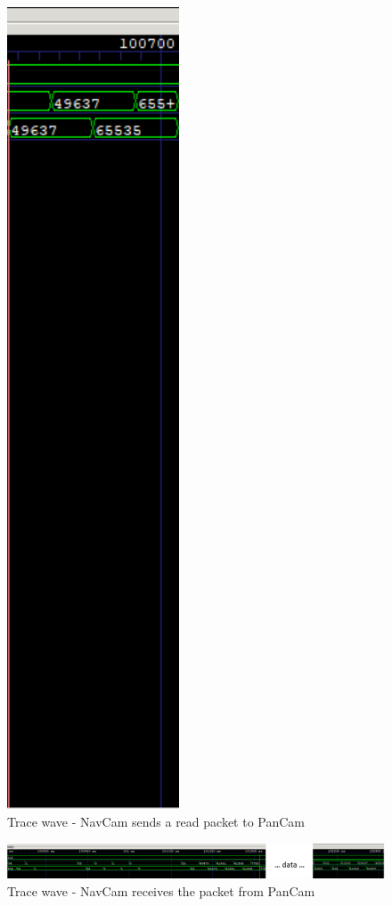 \documentclass[12pt,a4paper]{article}
\begin{document}
\begin{figure}[hb]
    \includegraphics[scale = 0.36]{results/tracewave_5.png}
    \caption{Trace wave - NavCam sends a read packet to PanCam}
\end{figure}

\pagebreak

\begin{figure}[hb]
	\centering
    \includegraphics[scale = 0.55]{results/tracewave_6_et_7.png}
    \caption{Trace wave - NavCam receives the packet from PanCam}
\end{figure}
\end{document}
